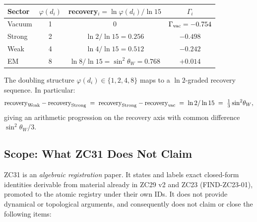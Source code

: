 \documentclass[12pt, a4paper]{article}
\begin{document}
\begin{center}
{\small
\begin{tabular}{lccc}
\toprule
Sector & $\varphi(d_i)$ & recovery$_i = \ln\varphi(d_i)/\ln 15$ & $\Gamma_i$\\
\midrule
Vacuum  & 1 & $0$              & $\Gamma_{\rm vac} = -0.754$\\
Strong  & 2 & $\ln 2/\ln 15 = 0.256$ & $-0.498$\\
Weak    & 4 & $\ln 4/\ln 15 = 0.512$ & $-0.242$\\
EM      & 8 & $\ln 8/\ln 15 = \sin^2\!\theta_W = 0.768$ & $+0.014$\\
\bottomrule
\end{tabular}
}
\end{center}
\medskip

The doubling structure $\varphi(d_i) \in \{1, 2, 4, 8\}$
maps to a $\ln 2$-graded recovery sequence. In particular:
\[
  \text{recovery}_{\rm Weak} - \text{recovery}_{\rm Strong}
    \;=\; \text{recovery}_{\rm Strong} - \text{recovery}_{\rm vac}
    \;=\; \ln 2 / \ln 15
    \;=\; \tfrac{1}{3}\sin^2\!\theta_W,
\]
giving an arithmetic progression on the recovery axis with
common difference $\sin^2\!\theta_W / 3$.

\subsection{Scope: What ZC31 Does Not Claim}
\label{sec:scope}

ZC31 is an \emph{algebraic registration} paper. It states and
labels exact closed-form identities derivable from material
already in ZC29 v2 and ZC23 (FIND-ZC23-01), promoted to the
atomic registry under their own IDs. It does not provide
dynamical or topological arguments, and consequently does not
claim or close the following items:
\end{document}
